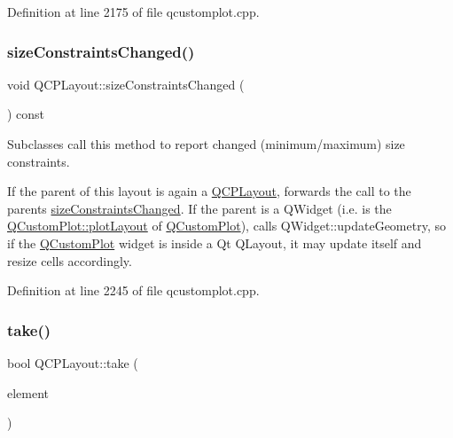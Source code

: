 Definition at line 2175 of file qcustomplot.\+cpp.

\mbox{\label{class_q_c_p_layout_aeac66a292f65cf7f8adf94eb92345b3e}} 
\subsubsection{\texorpdfstring{size\+Constraints\+Changed()}{sizeConstraintsChanged()}}
{\footnotesize\ttfamily void Q\+C\+P\+Layout\+::size\+Constraints\+Changed (\begin{DoxyParamCaption}{ }\end{DoxyParamCaption}) const\hspace{0.3cm}{\ttfamily [protected]}}

Subclasses call this method to report changed (minimum/maximum) size constraints.

If the parent of this layout is again a \hyperlink{class_q_c_p_layout}{Q\+C\+P\+Layout}, forwards the call to the parent\textquotesingle{}s \hyperlink{class_q_c_p_layout_aeac66a292f65cf7f8adf94eb92345b3e}{size\+Constraints\+Changed}. If the parent is a Q\+Widget (i.\+e. is the \hyperlink{class_q_custom_plot_af1a1f1f571237deb7c2bd34a5e9f018f}{Q\+Custom\+Plot\+::plot\+Layout} of \hyperlink{class_q_custom_plot}{Q\+Custom\+Plot}), calls Q\+Widget\+::update\+Geometry, so if the \hyperlink{class_q_custom_plot}{Q\+Custom\+Plot} widget is inside a Qt Q\+Layout, it may update itself and resize cells accordingly. 

Definition at line 2245 of file qcustomplot.\+cpp.

\mbox{\label{class_q_c_p_layout_ada26cd17e56472b0b4d7fbbc96873e4c}} 
\subsubsection{\texorpdfstring{take()}{take()}}
{\footnotesize\ttfamily bool Q\+C\+P\+Layout\+::take (\begin{DoxyParamCaption}\item[{\hyperlink{class_q_c_p_layout_element}{Q\+C\+P\+Layout\+Element} $\ast$}]{element }\end{DoxyParamCaption})\hspace{0.3cm}{\ttfamily [pure virtual]}}

